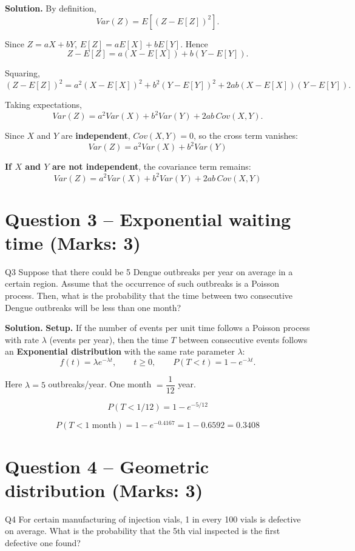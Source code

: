 \documentclass[11pt]{article}
\newcommand{\soln}{\par\noindent\textcolor{acolor}{\textbf{Solution.}}\quad}
\begin{document}
\soln
By definition,
\[
Var(Z) = E[(Z - E[Z])^2].
\]

Since $Z = aX+bY$, $E[Z] = aE[X] + bE[Y]$. Hence
\[
Z - E[Z] = a(X-E[X]) + b(Y - E[Y]).
\]

Squaring,
\[
(Z-E[Z])^2 = a^2(X-E[X])^2 + b^2(Y-E[Y])^2 + 2ab(X-E[X])(Y-E[Y]).
\]

Taking expectations,
\[
Var(Z) = a^2 Var(X) + b^2 Var(Y) + 2ab\, Cov(X,Y).
\]

Since $X$ and $Y$ are \textbf{independent}, $Cov(X,Y) = 0$, so the cross term vanishes:
\[
\boxed{Var(Z) = a^2 Var(X) + b^2 Var(Y)}
\]

\textbf{If $X$ and $Y$ are not independent}, the covariance term remains:
\[
\boxed{Var(Z) = a^2 Var(X) + b^2 Var(Y) + 2ab\,Cov(X,Y)}
\]

\section{Question 3 -- Exponential waiting time (Marks: 3)}
\begin{question}{Q3}
Suppose that there could be 5 Dengue outbreaks per year on average in a certain region. Assume that the occurrence of such outbreaks is a Poisson process. Then, what is the probability that the time between two consecutive Dengue outbreaks will be less than one month?
\end{question}

\soln
\textbf{Setup.} If the number of events per unit time follows a Poisson process with rate $\lambda$ (events per year), then the time $T$ between consecutive events follows an \textbf{Exponential distribution} with the same rate parameter $\lambda$:
\[
f(t) = \lambda e^{-\lambda t}, \qquad t \ge 0, \qquad P(T < t) = 1 - e^{-\lambda t}.
\]

Here $\lambda = 5$ outbreaks/year. One month $= \dfrac{1}{12}$ year.

\[
P(T < 1/12) = 1 - e^{-5/12}
\]

\[
\boxed{P(T < 1\text{ month}) = 1 - e^{-0.4167} = 1 - 0.6592 = 0.3408}
\]

\section{Question 4 -- Geometric distribution (Marks: 3)}
\begin{question}{Q4}
For certain manufacturing of injection vials, 1 in every 100 vials is defective on average. What is the probability that the 5th vial inspected is the first defective one found?
\end{question}
\end{document}

